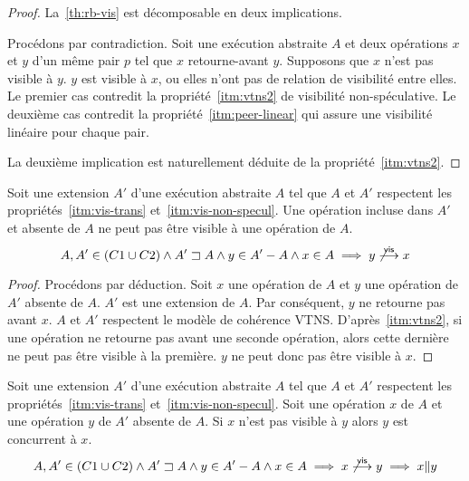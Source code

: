 \begin{proof}
La~\autoref{th:rb-vis} est décomposable en deux implications.

Procédons par contradiction.
Soit une exécution abstraite $A$ et deux opérations $x$ et $y$ d'un même pair $p$ tel que $x$ retourne-avant $y$.
Supposons que $x$ n'est pas visible à $y$.
$y$ est visible à $x$, ou elles n'ont pas de relation de visibilité entre elles.
Le premier cas contredit la propriété~\ref{itm:vtns2} de visibilité non-spéculative.
Le deuxième cas contredit la propriété~\ref{itm:peer-linear} qui assure une visibilité linéaire pour chaque pair.

La deuxième implication est naturellement déduite de la propriété~\ref{itm:vtns2}.
\end{proof}

\begin{proposition}\label{th:future-vis}
Soit une extension $A'$ d'une exécution abstraite $A$ tel que $A$ et $A'$ respectent les propriétés~\ref{itm:vis-trans} et~\ref{itm:vis-non-specul}.
Une opération incluse dans $A'$ et absente de $A$ ne peut pas être visible à une opération de $A$.
\begin{equation*}
    A, A' \in (C1 \cup C2) \land A' \sqsupset A \land y \in A'- A \land x \in A \implies y \not\overset{\mathsf{vis}}{\longrightarrow} x
\end{equation*}
\end{proposition}

\begin{proof}
Procédons par déduction.
Soit $x$ une opération de $A$ et $y$ une opération de $A'$ absente de $A$.
$A'$ est une extension de $A$.
Par conséquent, $y$ ne retourne pas avant $x$.
$A$ et $A'$ respectent le modèle de cohérence \ac{VTNS}.
D'après~\ref{itm:vtns2}, si une opération ne retourne pas avant une seconde opération, alors cette dernière ne peut pas être visible à la première.
$y$ ne peut donc pas être visible à $x$.
\end{proof}

\begin{corollary}\label{th:future-concur}
Soit une extension $A'$ d'une exécution abstraite $A$ tel que $A$ et $A'$ respectent les propriétés~\ref{itm:vis-trans} et~\ref{itm:vis-non-specul}.
Soit une opération $x$ de $A$ et une opération $y$ de $A'$ absente de $A$.
Si $x$ n'est pas visible à $y$ alors $y$ est concurrent à $x$.
\begin{equation*}
    A, A' \in (C1 \cup C2) \land A' \sqsupset A \land y \in A'- A \land x \in A \implies x \not\overset{\mathsf{vis}}{\longrightarrow} y \implies x \| y
\end{equation*}
\end{corollary}

